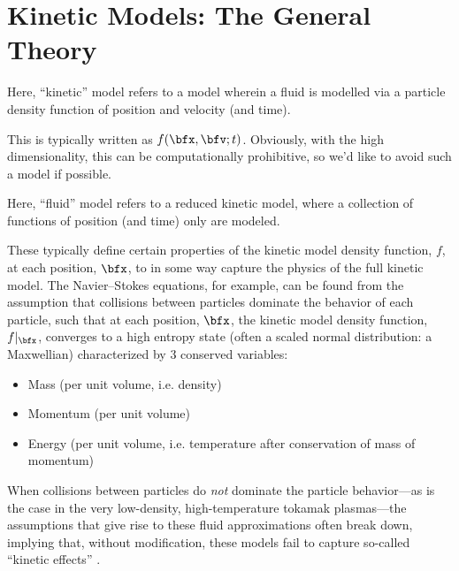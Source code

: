 \section{Kinetic Models: The General Theory}
    
    \begin{definition}
        Here, ``kinetic'' model refers to a model wherein a fluid is modelled via a particle density function of position and velocity (and time).
    \end{definition}
    
    This is typically written as $f(\bfx, \bfv; t)$. Obviously, with the high dimensionality, this can be computationally prohibitive, so we'd like to avoid such a model if possible.
    
    
    \begin{definition}
        Here, ``fluid'' model refers to a reduced kinetic model, where a collection of functions of position (and time) only are modeled.
    \end{definition}
    
    These typically define certain properties of the kinetic model density function, $f$, at each position, $\bfx$, to in some way capture the physics of the full kinetic model. The Navier–Stokes equations, for example, can be found from the assumption that collisions between particles dominate the behavior of each particle, such that at each position, $\bfx$, the kinetic model density function, $f|_{\bfx}$, converges to a high entropy state (often a scaled normal distribution: a Maxwellian) characterized by 3 conserved variables:
    \begin{itemize}
        \item  Mass (per unit volume, i.e. density)
        \item  Momentum (per unit volume)
        \item  Energy (per unit volume, i.e. temperature after conservation of mass of momentum)
    \end{itemize}
    When collisions between particles do \emph{not} dominate the particle behavior—as is the case in the very low-density, high-temperature  tokamak plasmas—the assumptions that give rise to these fluid approximations often break down, implying that, without modification, these models fail to capture so-called ``kinetic effects'' .
    

